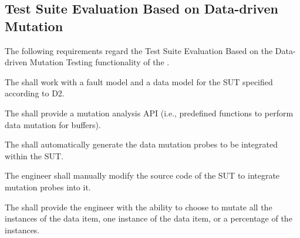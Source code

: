 

\subsection{Test Suite Evaluation Based on Data-driven Mutation}
\label{sec:dataDriven}

The following requirements regard the Test Suite Evaluation Based on the Data-driven Mutation Testing functionality of the \FAQAS.



\RQ{} The \FAQAS shall work with a fault model and a data model for the SUT specified according to D2.

\RQ{} The \FAQAS shall provide a mutation analysis API (i.e., predefined functions to perform data mutation for buffers).

\RQ{} The \FAQAS shall automatically generate the data mutation probes to be integrated within the SUT.

\RQ{} The engineer shall manually modify the source code of the SUT to integrate mutation probes into it.


%

\RQ{} The \FAQAS shall provide the engineer with the ability to choose to mutate all the instances of the data item, one instance of the data item, or a percentage of the instances.






